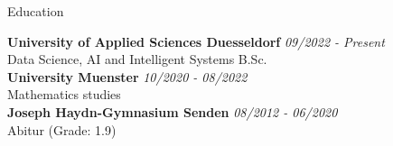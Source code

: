 \documentclass[
	11pt, %
]{src/resume} %
\begin{document}

\begin{rSection}{Education}
	
	\textbf{University of Applied Sciences Duesseldorf} \hfill \textit{09/2022 - Present} \\ 
	Data Science, AI and Intelligent Systems B.Sc. \\
	
	\textbf{University Muenster} \hfill \textit{10/2020 - 08/2022} \\
	Mathematics studies \\

	\textbf{Joseph Haydn-Gymnasium Senden} \hfill \textit{08/2012 - 06/2020} \\
	Abitur (Grade: 1.9) \\
\end{rSection}

\end{document}
